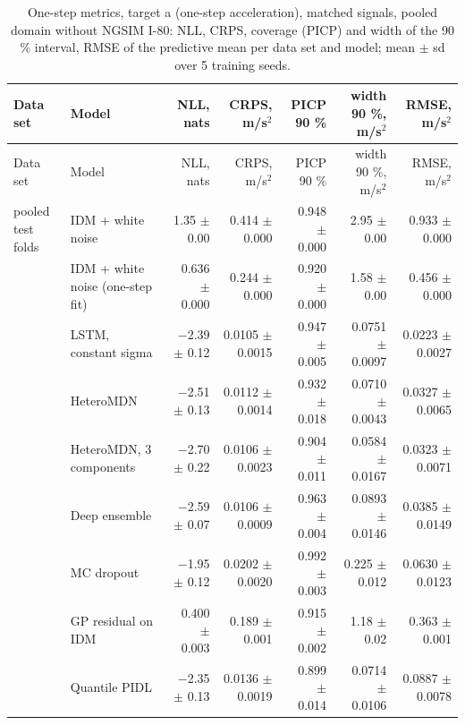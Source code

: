 \begingroup
\footnotesize
\begin{longtable}{llrrrrr}
\caption{One-step metrics, target a (one-step acceleration), matched signals, pooled domain without NGSIM I-80: NLL, CRPS, coverage (PICP) and width of the 90 \% interval, RMSE of the predictive mean per data set and model; mean $\pm$ sd over 5 training seeds.}\label{tab:t1-one-step--lodo-ngsim--a} \\
\toprule
Data set & Model & NLL, nats & CRPS, m/s$^2$ & PICP 90 \% & width 90 \%, m/s$^2$ & RMSE, m/s$^2$ \\
\midrule
\endfirsthead
\toprule
Data set & Model & NLL, nats & CRPS, m/s$^2$ & PICP 90 \% & width 90 \%, m/s$^2$ & RMSE, m/s$^2$ \\
\midrule
\endhead
\bottomrule
\endlastfoot
pooled test folds & IDM + white noise & 1.35 $\pm$ 0.00 & 0.414 $\pm$ 0.000 & 0.948 $\pm$ 0.000 & 2.95 $\pm$ 0.00 & 0.933 $\pm$ 0.000 \\
 & IDM + white noise (one-step fit) & 0.636 $\pm$ 0.000 & 0.244 $\pm$ 0.000 & 0.920 $\pm$ 0.000 & 1.58 $\pm$ 0.00 & 0.456 $\pm$ 0.000 \\
 & LSTM, constant sigma & $-$2.39 $\pm$ 0.12 & 0.0105 $\pm$ 0.0015 & 0.947 $\pm$ 0.005 & 0.0751 $\pm$ 0.0097 & 0.0223 $\pm$ 0.0027 \\
 & HeteroMDN & $-$2.51 $\pm$ 0.13 & 0.0112 $\pm$ 0.0014 & 0.932 $\pm$ 0.018 & 0.0710 $\pm$ 0.0043 & 0.0327 $\pm$ 0.0065 \\
 & HeteroMDN, 3 components & $-$2.70 $\pm$ 0.22 & 0.0106 $\pm$ 0.0023 & 0.904 $\pm$ 0.011 & 0.0584 $\pm$ 0.0167 & 0.0323 $\pm$ 0.0071 \\
 & Deep ensemble & $-$2.59 $\pm$ 0.07 & 0.0106 $\pm$ 0.0009 & 0.963 $\pm$ 0.004 & 0.0893 $\pm$ 0.0146 & 0.0385 $\pm$ 0.0149 \\
 & MC dropout & $-$1.95 $\pm$ 0.12 & 0.0202 $\pm$ 0.0020 & 0.992 $\pm$ 0.003 & 0.225 $\pm$ 0.012 & 0.0630 $\pm$ 0.0123 \\
 & GP residual on IDM & 0.400 $\pm$ 0.003 & 0.189 $\pm$ 0.001 & 0.915 $\pm$ 0.002 & 1.18 $\pm$ 0.02 & 0.363 $\pm$ 0.001 \\
 & Quantile PIDL & $-$2.35 $\pm$ 0.13 & 0.0136 $\pm$ 0.0019 & 0.899 $\pm$ 0.014 & 0.0714 $\pm$ 0.0106 & 0.0887 $\pm$ 0.0078 \\

\end{longtable}
